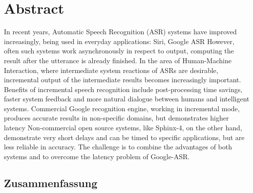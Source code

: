 \chapter*{Abstract}
In recent years, Automatic Speech Recognition (ASR) systems have improved
increasingly, being used in everyday applications: Siri, Google ASR However,
often such systems work asynchronously in respect to output, computing the
result after the utterance is already finished.
In the area of Human-Machine Interaction, 
where intermediate system reactions of ASRs are 
desirable,  incremental output of the intermediate results becomes increasingly
important. Benefits of  incremental speech recognition include post-processing
time savings, faster system feedback and more natural dialogue between humans
and intelligent systems. Commercial Google recognition
engine, working in incremental mode, produces accurate
results in non-specific domains, but demonstrates higher latency
Non-commercial open source systems, like Sphinx-4, on the other hand, demonstrate very short delays and can be timed to specific
applications, but are less reliable in accuracy.
The challenge is to combine the advantages of both systems and  to overcome the latency problem of Google-ASR.

\begin{otherlanguage}{ngerman}
\section*{Zusammenfassung}
\end{otherlanguage}